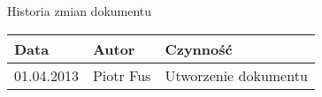 \documentclass[11pt,a4paper]{article}
\begin{document}
  {\Large Historia zmian dokumentu}
  \begin{center}
    \begin{tabular}{ | l | l | l | }
      \rowcolor{historiaZmianNaglowek}
      \hline
      Data & Autor & Czynność \\ \hline
      01.04.2013 & Piotr Fus & Utworzenie dokumentu \\ \hline
    \end{tabular}
  \end{center}
  
\end{document}
